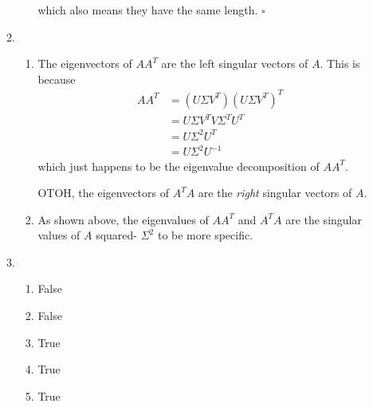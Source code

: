 \documentclass[12pt]{article}
\begin{document}
\begin{enumerate}
\begin{enumerate}
\begin{enumerate}
                                    which also means they have the same length. $\square$
                        \end{enumerate}
                  \item \begin{enumerate}
                              \item The eigenvectors of $AA^T$ are the left singular vectors of $A$.
                                    This is because
                                    \begin{align*}
                                          AA^T
                                           & = \left(U \Sigma V^T\right)\left(U \Sigma V^T\right)^T \\
                                           & = U \Sigma V^T V \Sigma^T U^T                          \\
                                           & = U \Sigma^2 U^T                                       \\
                                           & = U \Sigma^2 U^{-1}
                                    \end{align*}
                                    which just happens to be the eigenvalue decomposition of $AA^T$.

                                    OTOH, the eigenvectors of $A^T A$ are the \textit{right} singular vectors of $A$.
                              \item As shown above, the eigenvalues of $AA^T$ and $A^TA$ are
                                    the singular values of $A$ squared- $\Sigma^2$ to be more specific.
                        \end{enumerate}
                  \item \begin{enumerate}
                              \item False
                              \item False
                              \item True
                              \item True
                              \item True
                        \end{enumerate}
            \end{enumerate}

            \pagebreak


\end{enumerate}
\end{document}
